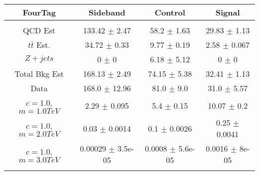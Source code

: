 \begin{footnotesize} 
\begin{tabular}{c|c|c|c} 
FourTag & Sideband & Control & Signal \\ 
\hline\hline 
& & & \\ 
QCD Est & 133.42 $\pm$ 2.47 & 58.2 $\pm$ 1.63 & 29.83 $\pm$ 1.13\\ 
$t\bar{t}$ Est.  & 34.72 $\pm$ 0.33 & 9.77 $\pm$ 0.19 & 2.58 $\pm$ 0.067\\ 
$Z+jets$ & 0 $\pm$ 0 & 6.18 $\pm$ 5.12 & 0 $\pm$ 0\\ 
Total Bkg Est & 168.13 $\pm$ 2.49 & 74.15 $\pm$ 5.38 & 32.41 $\pm$ 1.13\\ 
Data & 168.0 $\pm$ 12.96 & 81.0 $\pm$ 9.0 & 31.0 $\pm$ 5.57\\ 
$c=1.0$,$m=1.0TeV$ & 2.29 $\pm$ 0.095 & 5.4 $\pm$ 0.15 & 10.07 $\pm$ 0.2\\ 
$c=1.0$,$m=2.0TeV$ & 0.03 $\pm$ 0.0014 & 0.1 $\pm$ 0.0026 & 0.25 $\pm$ 0.0041\\ 
$c=1.0$,$m=3.0TeV$ & 0.00029 $\pm$ 3.5e-05 & 0.0008 $\pm$ 5.6e-05 & 0.0016 $\pm$ 8e-05\\ 
& & & \\ 
\hline\hline 
\end{tabular} 
\end{footnotesize} 
\newline 
